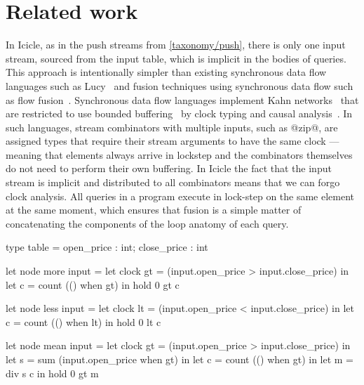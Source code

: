 \section{Related work}
\label{icicle:s:Conclusion}


In Icicle, as in the push streams from \cref{taxonomy/push}, there is only one input stream, sourced from the input table, which is implicit in the bodies of queries.
This approach is intentionally simpler than existing synchronous data flow languages such as Lucy~\cite{mandel2010lucy} and fusion techniques using synchronous data flow such as flow fusion~\cite{lippmeier2013data}.
Synchronous data flow languages implement Kahn networks~\cite{vrba2009kahn} that are restricted to use bounded buffering~\cite{johnston2004advances} by clock typing and causal analysis~\cite{stephens1997survey}.
In such languages, stream combinators with multiple inputs, such as @zip@, are assigned types that require their stream arguments to have the same clock --- meaning that elements always arrive in lockstep and the combinators themselves do not need to perform their own buffering.
In Icicle the fact that the input stream is implicit and distributed to all combinators means that we can forgo clock analysis.
All queries in a program execute in lock-step on the same element at the same moment, which ensures that fusion is a simple matter of concatenating the components of the loop anatomy of each query.

\begin{lucy}[float,caption=Lucid-Synchrone implementation of stocks queries,label=icicle:fig:related:lucy:stocks]
type table = { open_price : int; close_price : int }

let node more input =
 let clock gt = (input.open_price > input.close_price)
 in let c = count (() when gt)
 in hold 0 gt c

let node less input =
 let clock lt = (input.open_price < input.close_price)
 in let c = count (() when lt)
 in hold 0 lt c

let node mean input =
 let clock gt = (input.open_price > input.close_price)
 in let s = sum (input.open_price when gt)
 in let c = count (() when gt)
 in let m = div s c
 in hold 0 gt m
\end{lucy}

